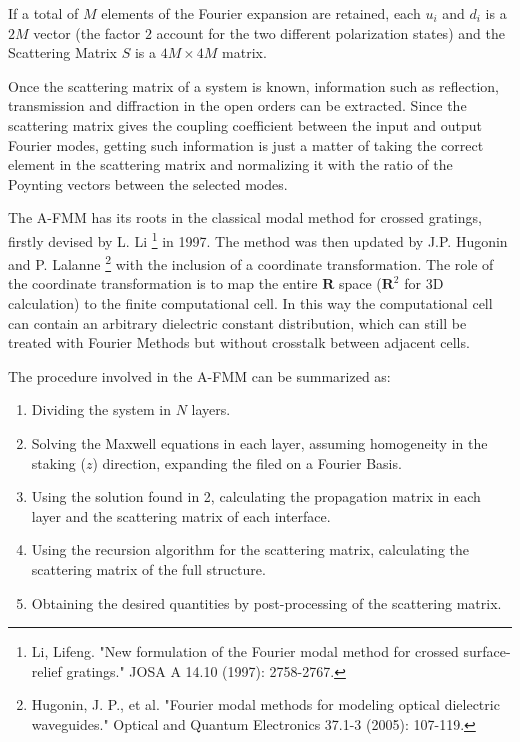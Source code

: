 \documentclass[a4paper,10pt]{report}
\begin{document}
If a total of $M$ elements of the Fourier expansion are retained, each $u_i$ and $d_i$ is a $2M$ vector (the factor $2$ account for the two different polarization states) and the Scattering Matrix $S$ is a $4M \times 4M$ matrix. 

Once the scattering matrix of a system is known, information such as reflection, transmission and diffraction in the open orders can be extracted. Since the scattering matrix gives the coupling coefficient between the input and output Fourier modes, getting such information is just a matter of taking the correct element in the scattering matrix and normalizing it with the ratio of the Poynting vectors between the selected modes. 

The A-FMM has its roots in the classical modal method for crossed gratings, firstly devised by L. Li \footnote{Li, Lifeng. "New formulation of the Fourier modal method for crossed surface-relief gratings." JOSA A 14.10 (1997): 2758-2767.} in 1997. The method was then updated by J.P. Hugonin and P. Lalanne \footnote{Hugonin, J. P., et al. "Fourier modal methods for modeling optical dielectric waveguides." Optical and Quantum Electronics 37.1-3 (2005): 107-119.} with the inclusion of a coordinate transformation. The role of the coordinate transformation is to map the entire $\mathbf{R}$ space ($\mathbf{R}^2$ for 3D calculation) to the finite computational cell. In this way the computational cell can contain an arbitrary dielectric constant distribution, which can still be treated with Fourier Methods but without crosstalk between adjacent cells.

The procedure involved in the A-FMM can be summarized as:
\begin{enumerate}
\itemsep0em 
\item Dividing the system in $N$ layers.
\item Solving the Maxwell equations in each layer, assuming homogeneity in the staking ($z$) direction, expanding the filed on a Fourier Basis. 
\item Using the solution found in 2, calculating the propagation matrix in each layer and the scattering matrix of each interface.
\item Using the recursion algorithm for the scattering matrix, calculating the scattering matrix of the full structure. 
\item Obtaining the desired quantities by post-processing of the scattering matrix. 
\end{enumerate}
\end{document}
